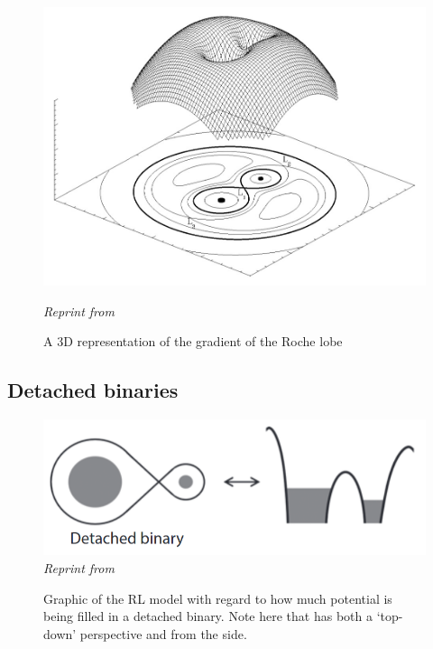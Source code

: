\documentclass[12pt, a4paper]{article}
\begin{document}
    \vspace*{\fill}
    \begin{figure}[H]
        \centering
        \includegraphics[width=\textwidth]{figs/reused-figs/Wiki-RochePotential.jpg}
        \caption{ A 3D representation of the gradient of the Roche lobe}
        \label{fig:Roche_potential}
        \textit{\small Reprint from \parencite{vandersluys2005}}
    \end{figure}
    \vspace*{\fill}

        \subsection{Detached binaries}\label{DetachedBinary}

        \begin{figure}[H]
            \centering
            \includegraphics[scale = .4]{figs/reused-figs/Tauris_DetachedBinary.png}\\
            \textit{Reprint from~\parencite{TaurisvandenHeuvel+2023}}
            \caption{Graphic of the RL model with regard to how much potential is being filled in a detached binary. Note here that has both a `top-down' perspective and from the side.}
            \label{DetachedBinaryRL}
        \end{figure}
\end{document}
